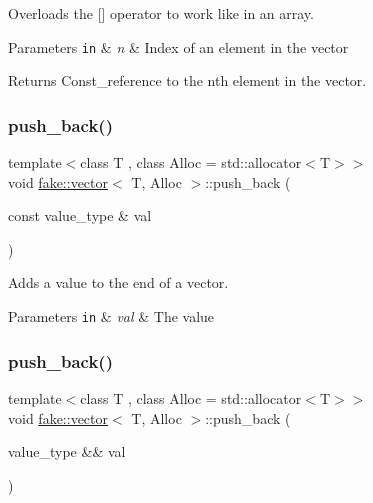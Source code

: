 Overloads the \mbox{[}\mbox{]} operator to work like in an array. 


\begin{DoxyParams}[1]{Parameters}
\mbox{\tt in}  & {\em n} & Index of an element in the vector\\
\hline
\end{DoxyParams}
\begin{DoxyReturn}{Returns}
Const\+\_\+reference to the n\textquotesingle{}th element in the vector. 
\end{DoxyReturn}
\mbox{\label{classfake_1_1vector_a91aad69b6cb2986a6b31f965633a9998}} 
\subsubsection{\texorpdfstring{push\+\_\+back()}{push\_back()}\hspace{0.1cm}{\footnotesize\ttfamily [1/2]}}
{\footnotesize\ttfamily template$<$class T , class Alloc  = std\+::allocator$<$\+T$>$$>$ \\
void \mbox{\hyperlink{classfake_1_1vector}{fake\+::vector}}$<$ T, Alloc $>$\+::push\+\_\+back (\begin{DoxyParamCaption}\item[{const value\+\_\+type \&}]{val }\end{DoxyParamCaption})\hspace{0.3cm}{\ttfamily [inline]}}



Adds a value to the end of a vector. 


\begin{DoxyParams}[1]{Parameters}
\mbox{\tt in}  & {\em val} & The value \\
\hline
\end{DoxyParams}
\mbox{\label{classfake_1_1vector_a2532ed889fcf192d2f66080134d4470a}} 
\subsubsection{\texorpdfstring{push\+\_\+back()}{push\_back()}\hspace{0.1cm}{\footnotesize\ttfamily [2/2]}}
{\footnotesize\ttfamily template$<$class T , class Alloc  = std\+::allocator$<$\+T$>$$>$ \\
void \mbox{\hyperlink{classfake_1_1vector}{fake\+::vector}}$<$ T, Alloc $>$\+::push\+\_\+back (\begin{DoxyParamCaption}\item[{value\+\_\+type \&\&}]{val }\end{DoxyParamCaption})\hspace{0.3cm}{\ttfamily [inline]}}



